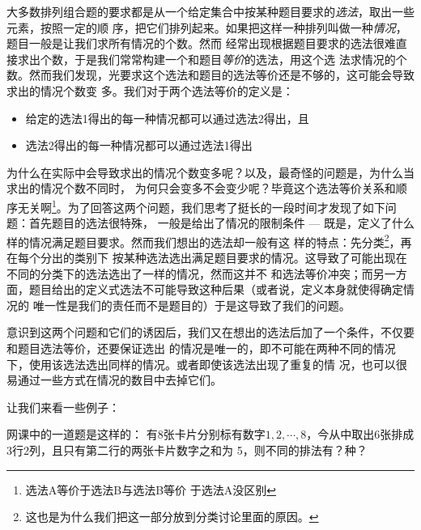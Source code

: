 大多数排列组合题的要求都是从一个给定集合中按某种题目要求的\emph{选法}，取出一些元素，按照一定的顺
序，把它们排列起来。如果把这样一种排列叫做一种\emph{情况}，题目一般是让我们求所有情况的个数。然而
经常出现根据题目要求的选法很难直接求出个数，于是我们常常构建一个和题目\emph{等价}的选法，用这个选
法求情况的个数。然而我们发现，光要求这个选法和题目的选法等价还是不够的，这可能会导致求出的情况个数变
多。我们对于两个选法等价的定义是：
\begin{itemize}
\item 给定的选法1得出的每一种情况都可以通过选法2得出，且
\item 选法2得出的每一种情况都可以通过选法1得出
\end{itemize}
为什么在实际中会导致求出的情况个数变多呢？以及，最奇怪的问题是，为什么当求出的情况个数不同时，
为何只会变多不会变少呢？毕竟这个选法等价关系和顺序无关啊\footnote{选法A等价于选法B与选法B等价
于选法A没区别}。为了回答这两个问题，我们思考了挺长的一段时间才发现了如下问题：首先题目的选法很特殊，
一般是给出了情况的限制条件 --- 既是，定义了什么样的情况满足题目要求。然而我们想出的选法却一般有这
样的特点：先分类\footnote{这也是为什么我们把这一部分放到分类讨论里面的原因。}，再在每个分出的类别下
按某种选法选出满足题目要求的情况。这导致了可能出现在不同的分类下的选法选出了一样的情况，然而这并不
和选法等价冲突；而另一方面，题目给出的定义式选法不可能导致这种后果（或者说，定义本身就使得确定情况的
唯一性是我们的责任而不是题目的）于是这导致了我们的问题。

意识到这两个问题和它们的诱因后，我们又在想出的选法后加了一个条件，不仅要和题目选法等价，还要保证选出
的情况是唯一的，即不可能在两种不同的情况下，使用该选法选出同样的情况。或者即使该选法出现了重复的情
况，也可以很易通过一些方式在情况的数目中去掉它们。

让我们来看一些例子：

网课中的一道题是这样的：
有8张卡片分别标有数字$1,2,\cdots,8$，今从中取出6张排成3行2列，且只有第二行的两张卡片数字之和为
5，则不同的排法有？种？

